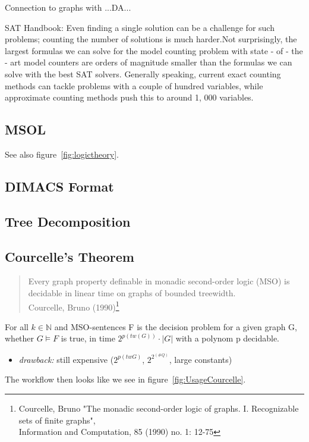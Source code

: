 \documentclass[a4paper, 12pt]{scrartcl}
\begin{document}
Connection to graphs with ...DA...

SAT Handbook:
Even finding a single solution can be a challenge
for such problems; counting the number of solutions is much harder.Not
surprisingly, the largest formulas we can solve for the model counting problem
with state - of - the - art model counters are orders of magnitude smaller than the
formulas we can solve with the best SAT solvers. Generally speaking, current
exact counting methods can tackle problems with a couple of hundred variables, while approximate counting methods push this to around 1, 000 variables.


\subsection{MSOL}
See also figure~\ref{fig:logictheory}.
\subsection{DIMACS Format}
\subsection{Tree Decomposition}
\subsection{Courcelle's Theorem}
\begin{quotation}
	Every graph property definable in monadic second-order logic (MSO) is decidable in linear time on graphs of bounded treewidth.\\
	{\small Courcelle, Bruno (1990)}\footnote{Courcelle, Bruno "The monadic second-order logic of graphs. I. Recognizable sets of finite graphs",\\ Information and Computation, 85 (1990) no. 1: 12-75}
\end{quotation}

For all $k \in \mathbb{N}$ and MSO-sentences F is the decision problem for a given graph G, whether $G \models F$ is true, in time $2^{p(tw(G))} \cdot |G|$ with a polynom p decidable.
\begin{itemize}
	
	\item \emph{drawback:} still expensive ($2^{p(tw G)}$, $2^{2^{(\#Q)}}$, large constants) \smallskip 

\end{itemize}

The workflow then looks like we see in figure~\ref{fig:UsageCourcelle}.
\end{document}
